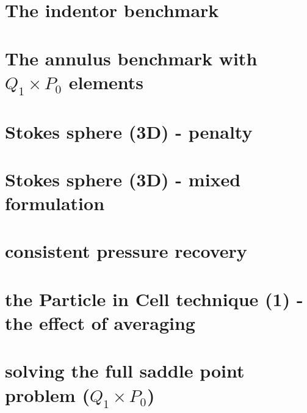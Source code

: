 \documentclass[a4paper,11pt]{report}
\begin{document}
\chapter{The indentor benchmark \label{f08}} %
 
\chapter{The annulus benchmark with $Q_1\times P_0$ elements \label{f09}} %

\chapter{Stokes sphere (3D) - penalty \label{f10}} %

\chapter{Stokes sphere (3D) - mixed formulation \label{f11}} %

\chapter{consistent pressure recovery \label{f12}} %

\chapter{the Particle in Cell technique (1) - the effect of averaging \label{f13}} %

\chapter{solving the full saddle point problem ($Q_1\times P_0$) \label{f14}} %
\end{document}
